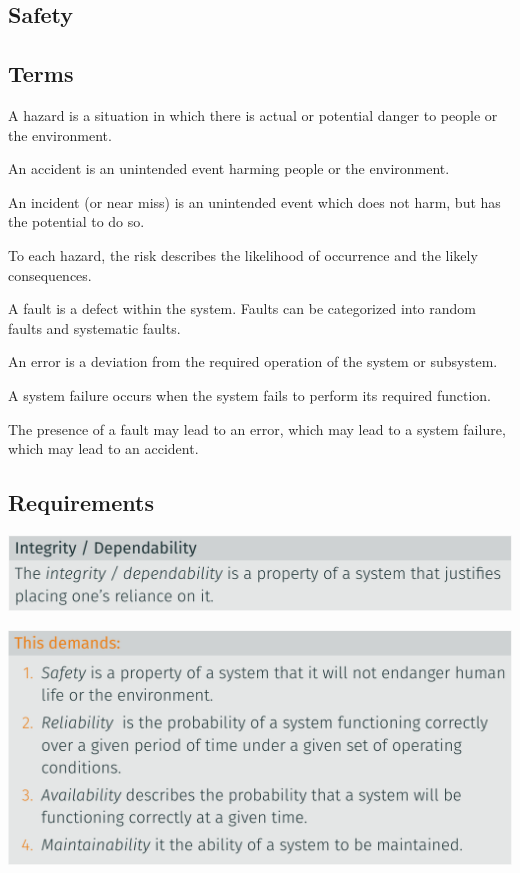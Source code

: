 \documentclass[
  10pt,
  a4paper,
]{article}
\providecommand{\tightlist}{%
  \setlength{\itemsep}{0pt}\setlength{\parskip}{0pt}}\usepackage{longtable,booktabs,array}
\begin{document}
\begin{multicols*}{2}
\newpage

\section{Safety}\label{safety}

\subsection{Terms}\label{terms}

\begin{description}
\tightlist
\item[Hazard]
A hazard is a situation in which there is actual or potential danger to
people or the environment.
\item[Accident]
An accident is an unintended event harming people or the environment.
\item[Incident]
An incident (or near miss) is an unintended event which does not harm,
but has the potential to do so.
\item[Risk]
To each hazard, the risk describes the likelihood of occurrence and the
likely consequences.
\item[Fault]
A fault is a defect within the system. Faults can be categorized into
random faults and systematic faults.
\item[Error]
An error is a deviation from the required operation of the system or
subsystem.
\item[System Failure]
A system failure occurs when the system fails to perform its required
function.
\item[Causalities]
The presence of a fault may lead to an error, which may lead to a system
failure, which may lead to an accident.
\end{description}

\subsection{Requirements}\label{requirements}

\includegraphics{images/safety/image-29.png}

\includegraphics{images/safety/image-30.png}


\end{multicols*}
\end{document}
